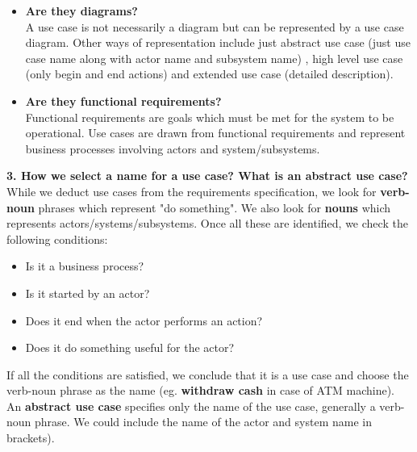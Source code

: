 \documentclass[12pt,letterpaper,titlepage,en-US]{article}
\begin{document}
\begin{itemize}[noitemsep,nolistsep]
\item \textbf{Are they diagrams?}\\
A use case is not necessarily a diagram but can be represented by a use case diagram. Other ways of representation include just abstract use case (just use case name along with actor name and subsystem name) , high level use case (only begin and end actions) and extended use case (detailed description).\\

\item \textbf{Are they functional requirements?}\\
Functional requirements are goals which must be met for the system to be operational. Use cases are drawn from functional requirements and represent business processes involving actors and system/subsystems.\\

\end{itemize}



 \textbf{3.	How we select a name for a use case? What is an abstract use case?}\\
  While we deduct use cases from the requirements specification, we look for \textbf{verb-noun} phrases which represent "do something". We also look for \textbf{nouns} which represents actors/systems/subsystems. Once all these are identified, we check the following conditions:
 \begin{itemize}[nolistsep,noitemsep]
 \item Is it a business process?
 \item Is it started by an actor?
 \item Does it end when the actor performs an action?
 \item Does it do something useful for the actor?
 
 
 \end{itemize}
If all the conditions are satisfied, we conclude that it is a use case and choose the verb-noun phrase as the name (eg. \textbf{withdraw cash} in case of ATM machine).\\

  
  An \textbf{abstract use case} specifies only the name of the use case, generally a verb-noun phrase. We could include the name of the actor and system name in brackets).\\
  
  
\end{document}
